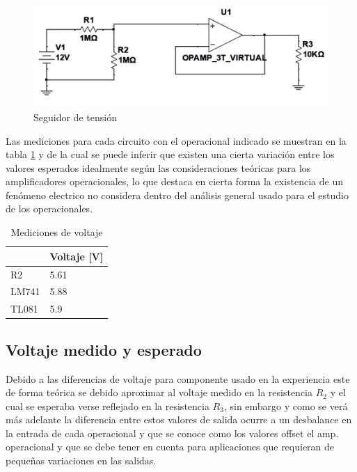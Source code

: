 \begin{figure}[h]
	\centering
	\includegraphics[width=0.8\linewidth]{media/seguidor-tension}
	\caption{Seguidor de tensión}
	\label{fig:seguidor-tension}
\end{figure}

Las mediciones para cada circuito con el operacional indicado se muestran en la tabla \ref{tab:mediciones-voltaje} y de la cual se puede inferir que existen una cierta variación entre los valores esperados idealmente según las consideraciones teóricas para los amplificadores operacionales, lo que destaca en cierta forma la existencia de un fenómeno electrico no considera dentro del análisis general usado para el estudio de los operacionales.

\begin{table}[]
	\begin{tabular}{|l|l|}
		\hline
		& Voltaje {[}V{]} \\ \hline
		R2    & 5.61            \\ \hline
		LM741 & 5.88            \\ \hline
		TL081 & 5.9             \\ \hline
	\end{tabular}
	\caption{Mediciones de voltaje}
	\label{tab:mediciones-voltaje}
\end{table}

\subsection{Voltaje medido y esperado}
Debido a las diferencias de voltaje para componente usado en la experiencia este de forma teórica se debido aproximar al voltaje medido en la resistencia $R_2$ y el cual se esperaba verse reflejado en la resistencia $R_3$, sin embargo y como se verá más adelante la diferencia entre estos valores de salida ocurre a un desbalance en la entrada de cada operacional y que se conoce como los valores offset el amp. operacional y que se debe tener en cuenta para aplicaciones que requieran de pequeñas variaciones en las salidas.

